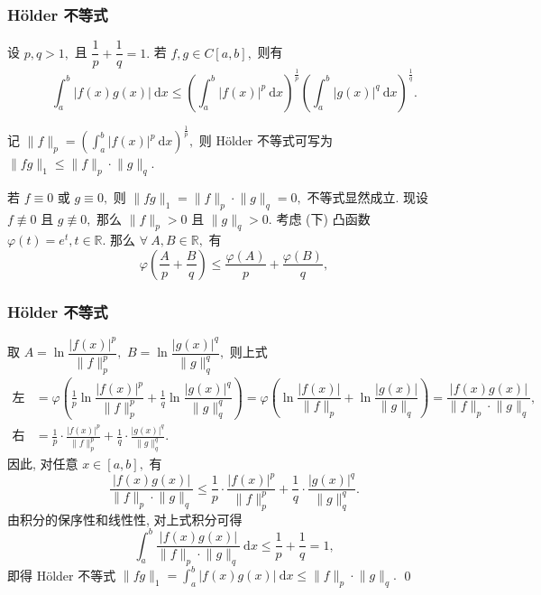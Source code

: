 
\begin{frame}
\frametitle{Hölder 不等式}

\begin{thm}
设 $p, q > 1,$ 且 $\dfrac{1}{p} + \dfrac{1}{q} = 1.$ 若 $f, g \in C[a, b],$ 则有
\[
\int_a^b |f(x) g(x)| ~ \mathrm{d} x \leqslant \left( \int_a^b |f(x)|^p ~ \mathrm{d} x \right)^{\frac{1}{p}} \left( \int_a^b |g(x)|^q ~ \mathrm{d} x \right)^{\frac{1}{q}}.
\]
\end{thm}

\begin{remark}
记 $\lVert f \rVert_p = \left( \int_a^b |f(x)|^p ~ \mathrm{d} x \right)^{\frac{1}{p}},$ 则 Hölder 不等式可写为 $\lVert fg \rVert_1 \leqslant \lVert f \rVert_p \cdot \lVert g \rVert_q.$
\end{remark}

\pause
\vspace{0.5em}

\startproof[bg=yellow, fg=red]
若 $f \equiv 0$ 或 $g \equiv 0,$ 则 $\lVert fg \rVert_1 = \lVert f \rVert_p \cdot \lVert g \rVert_q = 0,$ 不等式显然成立. 现设 $f \not\equiv 0$ 且 $g \not\equiv 0,$ 那么 $\lVert f \rVert_p > 0$ 且 $\lVert g \rVert_q > 0.$ 考虑 (下) 凸函数 $\varphi(t) = e^t, t \in \mathbb{R}.$ 那么 $\forall ~ A, B \in \mathbb{R},$ 有
\[
\varphi \left( \frac{A}{p} + \frac{B}{q} \right) \leqslant \frac{\varphi(A)}{p} + \frac{\varphi(B)}{q},
\]

\end{frame}


\begin{frame}
\frametitle{Hölder 不等式}

取 $A = \ln \dfrac{|f(x)|^p}{\lVert f \rVert_p^p},$ $B = \ln \dfrac{|g(x)|^q}{\lVert g \rVert_q^q},$ 则上式
\begin{align*}
\text{左边} & = \varphi \left( \frac{1}{p} \ln \dfrac{|f(x)|^p}{\lVert f \rVert_p^p} + \frac{1}{q} \ln \dfrac{|g(x)|^q}{\lVert g \rVert_q^q} \right) = \varphi \left( \ln \dfrac{|f(x)|}{\lVert f \rVert_p} + \ln \dfrac{|g(x)|}{\lVert g \rVert_q} \right) = \dfrac{|f(x) g(x)|}{\lVert f \rVert_p \cdot \lVert g \rVert_q}, \\
\text{右边} & = \frac{1}{p} \cdot \frac{|f(x)|^p}{\lVert f \rVert_p^p} + \frac{1}{q} \cdot \frac{|g(x)|^q}{\lVert g \rVert_q^q}.
\end{align*}
因此, 对任意 $x \in [a, b],$ 有
\[
\dfrac{|f(x) g(x)|}{\lVert f \rVert_p \cdot \lVert g \rVert_q} \leqslant \frac{1}{p} \cdot \frac{|f(x)|^p}{\lVert f \rVert_p^p} + \frac{1}{q} \cdot \frac{|g(x)|^q}{\lVert g \rVert_q^q}.
\]
由积分的保序性和线性性, 对上式积分可得
\[
\int_a^b \dfrac{|f(x) g(x)|}{\lVert f \rVert_p \cdot \lVert g \rVert_q} ~ \mathrm{d} x \leqslant \frac{1}{p} + \frac{1}{q} = 1,
\]
即得 Hölder 不等式 $\lVert fg \rVert_1 = \int_a^b |f(x) g(x)| ~ \mathrm{d} x \leqslant \lVert f \rVert_p \cdot \lVert g \rVert_q.$
\qed

\end{frame}

